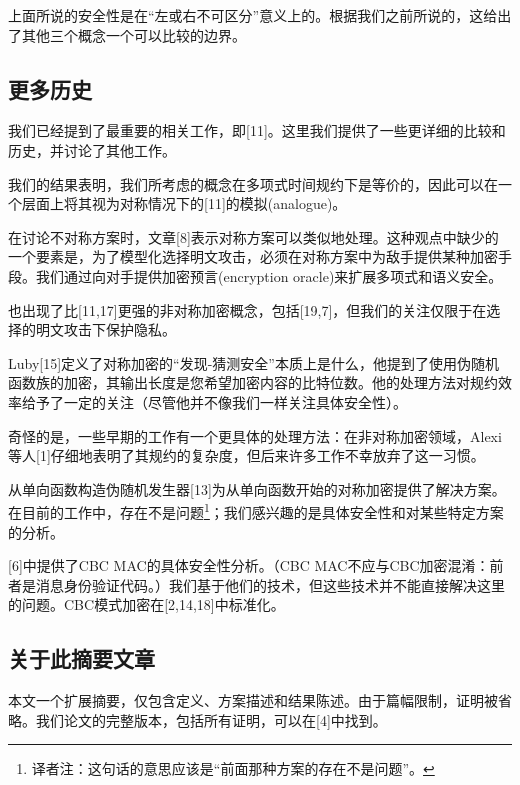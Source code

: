 \documentclass[]{article}
\begin{document}
上面所说的安全性是在“左或右不可区分”意义上的。根据我们之前所说的，这给出了其他三个概念一个可以比较的边界。

\subsection{更多历史}

我们已经提到了最重要的相关工作，即[11]。这里我们提供了一些更详细的比较和历史，并讨论了其他工作。\par

我们的结果表明，我们所考虑的概念在多项式时间规约下是等价的，因此可以在一个层面上将其视为对称情况下的[11]的模拟(analogue)。\par

在讨论不对称方案时，文章[8]表示对称方案可以类似地处理。这种观点中缺少的一个要素是，为了模型化选择明文攻击，必须在对称方案中为敌手提供某种加密手段。我们通过向对手提供加密预言(encryption oracle)来扩展多项式和语义安全。\par

也出现了比[11,17]更强的非对称加密概念，包括[19,7]，但我们的关注仅限于在选择的明文攻击下保护隐私。\par

Luby[15]定义了对称加密的“发现-猜测安全”本质上是什么，他提到了使用伪随机函数族的加密，其输出长度是您希望加密内容的比特位数。他的处理方法对规约效率给予了一定的关注（尽管他并不像我们一样关注具体安全性）。\par

奇怪的是，一些早期的工作有一个更具体的处理方法：在非对称加密领域，Alexi等人[1]仔细地表明了其规约的复杂度，但后来许多工作不幸放弃了这一习惯。\par

从单向函数构造伪随机发生器[13]为从单向函数开始的对称加密提供了解决方案。在目前的工作中，存在不是问题\footnote{译者注：这句话的意思应该是“前面那种方案的存在不是问题”。}；我们感兴趣的是具体安全性和对某些特定方案的分析。\par

[6]中提供了CBC MAC的具体安全性分析。（CBC MAC不应与CBC加密混淆：前者是消息身份验证代码。）我们基于他们的技术，但这些技术并不能直接解决这里的问题。CBC模式加密在[2,14,18]中标准化。

\subsection{关于此摘要文章}
本文一个扩展摘要，仅包含定义、方案描述和结果陈述。由于篇幅限制，证明被省略。我们论文的完整版本，包括所有证明，可以在[4]中找到。
\end{document}
